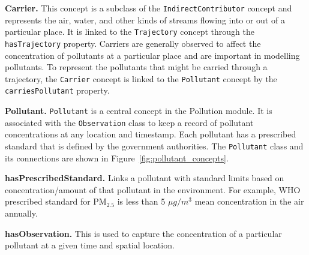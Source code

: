 \textbf{Carrier.} This concept is a subclass of the \texttt{IndirectContributor} concept and represents the air, water, and other kinds of streams flowing into or out of a particular place. It is linked to the \texttt{Trajectory} concept through the \texttt{hasTrajectory} property. Carriers are generally observed to affect the concentration of pollutants at a particular place and are important in modelling pollutants. To represent the pollutants that might be carried through a trajectory, the \texttt{Carrier} concept is linked to the \texttt{Pollutant} concept by the \texttt{carriesPollutant} property. %


\textbf{Pollutant.} \texttt{Pollutant} is a central concept in the Pollution module. It is  associated with the \texttt{Observation} class to keep a record of pollutant concentrations at any location and timestamp. Each pollutant has a prescribed standard that is defined by the government authorities. The \texttt{Pollutant} class and its connections are shown in Figure~\ref{fig:pollutant_concepts}. %


\textbf{hasPrescribedStandard.} Links a pollutant with standard limits based on concentration/amount of that pollutant in the environment. For example, WHO prescribed standard for PM$_{2.5}$ is less than 5 $\mu g/m^3$ mean concentration in the air annually. 

\textbf{hasObservation.} This is used to capture the concentration of a particular pollutant at a given time and spatial location.

